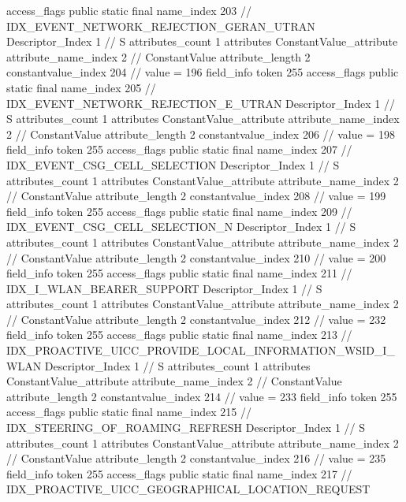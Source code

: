 {{{{{				access_flags	public static final
				name_index	203		// IDX_EVENT_NETWORK_REJECTION_GERAN_UTRAN
				Descriptor_Index	1		// S
				attributes_count	1
				attributes {
				ConstantValue_attribute {
					attribute_name_index	2		// ConstantValue
					attribute_length	2
					constantvalue_index	204		// value = 196
				}
				}
			}
			field_info {
				token	255
				access_flags	public static final
				name_index	205		// IDX_EVENT_NETWORK_REJECTION_E_UTRAN
				Descriptor_Index	1		// S
				attributes_count	1
				attributes {
				ConstantValue_attribute {
					attribute_name_index	2		// ConstantValue
					attribute_length	2
					constantvalue_index	206		// value = 198
				}
				}
			}
			field_info {
				token	255
				access_flags	public static final
				name_index	207		// IDX_EVENT_CSG_CELL_SELECTION
				Descriptor_Index	1		// S
				attributes_count	1
				attributes {
				ConstantValue_attribute {
					attribute_name_index	2		// ConstantValue
					attribute_length	2
					constantvalue_index	208		// value = 199
				}
				}
			}
			field_info {
				token	255
				access_flags	public static final
				name_index	209		// IDX_EVENT_CSG_CELL_SELECTION_N
				Descriptor_Index	1		// S
				attributes_count	1
				attributes {
				ConstantValue_attribute {
					attribute_name_index	2		// ConstantValue
					attribute_length	2
					constantvalue_index	210		// value = 200
				}
				}
			}
			field_info {
				token	255
				access_flags	public static final
				name_index	211		// IDX_I_WLAN_BEARER_SUPPORT
				Descriptor_Index	1		// S
				attributes_count	1
				attributes {
				ConstantValue_attribute {
					attribute_name_index	2		// ConstantValue
					attribute_length	2
					constantvalue_index	212		// value = 232
				}
				}
			}
			field_info {
				token	255
				access_flags	public static final
				name_index	213		// IDX_PROACTIVE_UICC_PROVIDE_LOCAL_INFORMATION_WSID_I_WLAN
				Descriptor_Index	1		// S
				attributes_count	1
				attributes {
				ConstantValue_attribute {
					attribute_name_index	2		// ConstantValue
					attribute_length	2
					constantvalue_index	214		// value = 233
				}
				}
			}
			field_info {
				token	255
				access_flags	public static final
				name_index	215		// IDX_STEERING_OF_ROAMING_REFRESH
				Descriptor_Index	1		// S
				attributes_count	1
				attributes {
				ConstantValue_attribute {
					attribute_name_index	2		// ConstantValue
					attribute_length	2
					constantvalue_index	216		// value = 235
				}
				}
			}
			field_info {
				token	255
				access_flags	public static final
				name_index	217		// IDX_PROACTIVE_UICC_GEOGRAPHICAL_LOCATION_REQUEST
}}}}}
